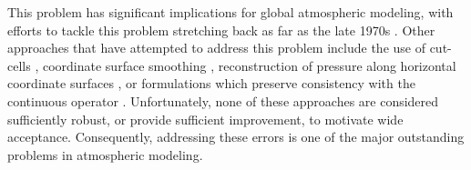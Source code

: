 \documentclass[11pt]{article}
\begin{document}

This problem has significant implications for global atmospheric modeling, with efforts to tackle this problem stretching back as far as the late 1970s \cite{ZIJ1977BzPdA, DTMZIJ1986MAP}.  Other approaches that have attempted to address this problem include the use of cut-cells \cite{JSSHPAD2013GMDD}, coordinate surface smoothing \cite{JBK2011MWR}, reconstruction of pressure along horizontal coordinate surfaces \cite{GZ2012MWR}, or formulations which preserve consistency with the continuous operator \cite{SJL1997QJRMS}.  Unfortunately, none of these approaches are considered sufficiently robust, or provide sufficient improvement, to motivate wide acceptance.  Consequently, addressing these errors is one of the major outstanding problems in atmospheric modeling.

\end{document}
